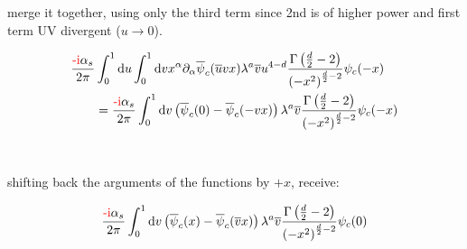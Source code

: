 merge it together, using only the third term since 2nd is of higher power and first term UV divergent ($u\rightarrow 0$).

\begin{align}
	\frac{\text{\textcolor{red}{-\text{i}}}\alpha_s}{2\pi} &\int_0^1 \text{d} u \int_0^1\text{d} v  x^\alpha\partial_\alpha\overline\psi_c(\overline u vx ) \lambda^a  \overline v u^{4-d} \frac{\Gamma\left(\frac{d}{2}-2\right)}{\left(-x^2\right)^{\frac{d}{2}-2}}\psi_c(-x)
	\\
	&=
	\frac{\text{\textcolor{red}{-\text{i}}}\alpha_s}{2\pi} \int_0^1\text{d} v  \left(\overline\psi_c(0) - \overline\psi_c(-vx)\right) \lambda^a  \overline v  \frac{\Gamma\left(\frac{d}{2}-2\right)}{\left(-x^2\right)^{\frac{d}{2}-2}}\psi_c(-x)
\end{align}

\\ 

shifting back the arguments of the functions by $+x$, receive:

\begin{align}
\frac{\text{\textcolor{red}{-\text{i}}}\alpha_s}{2\pi} \int_0^1\text{d} v  \left(\overline\psi_c(x) - \overline\psi_c(\overline v x)\right) \lambda^a  \overline v  \frac{\Gamma\left(\frac{d}{2}-2\right)}{\left(-x^2\right)^{\frac{d}{2}-2}}\psi_c(0)
\end{align}

